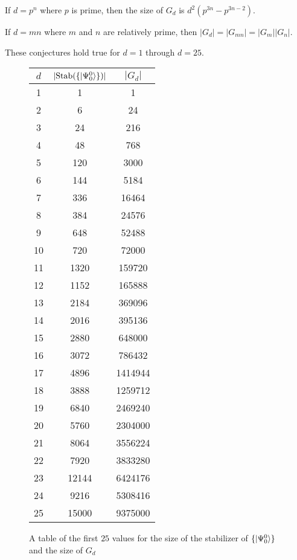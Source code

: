 \begin{conjecture}
  If $d = p^n$ where $p$ is prime, then the size of $G_d$ is $d^2(p^{3n} - p^{3n-2})$.
\end{conjecture}

\begin{conjecture}
  If $d = mn$ where $m$ and $n$ are relatively prime, then $|G_d| = |G_{mn}| = |G_m||G_n|$.
\end{conjecture}

These conjectures hold true for $d = 1$ through $d = 25$.

\begin{figure}
\begin{center}
\begin{tabular}{ | c | c | c| } 
\hline
 $d$ & $|\text{Stab}(\{| \Psi_0^0 \rangle\})|$ & $|G_d|$ \\ 
\hline
1 & 1 & 1 \\ 
\hline
2 & 6 & 24 \\ 
\hline
3 & 24 & 216 \\ 
\hline
4 & 48 & 768 \\ 
\hline
5 & 120 & 3000 \\ 
\hline
6 & 144 & 5184 \\ 
\hline
7 & 336 & 16464 \\ 
\hline
8 & 384 & 24576 \\ 
\hline
9 & 648 & 52488 \\ 
\hline
10 & 720 & 72000 \\ 
\hline
11 & 1320 & 159720 \\ 
\hline
12 & 1152 & 165888 \\ 
\hline
13 & 2184 & 369096 \\ 
\hline
14 & 2016 & 395136 \\ 
\hline
15 & 2880 & 648000 \\ 
\hline
16 & 3072 & 786432 \\ 
\hline
17 & 4896 & 1414944 \\ 
\hline
18 & 3888 & 1259712 \\ 
\hline
19 & 6840 & 2469240 \\ 
\hline
20 & 5760 & 2304000 \\ 
\hline
21 & 8064 & 3556224 \\ 
\hline
22 & 7920 & 3833280 \\ 
\hline
23 & 12144 & 6424176 \\ 
\hline
24 & 9216 & 5308416 \\ 
\hline
25 & 15000 & 9375000 \\ 
\hline
\end{tabular}
\end{center}
\caption{A table of the first $25$ values for the size of the stabilizer of $\{| \Psi_0^0 \rangle\}$ and the size of $G_d$} \label{fig:table1}
\end{figure}

